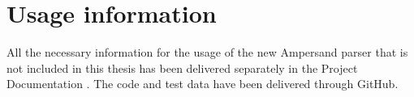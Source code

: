 
\section*{Usage information}
\label{sec:usage-information}
All the necessary information for the usage of the new Ampersand parser that is not included in this thesis has been delivered separately in the Project Documentation .
The code and test data have been delivered through GitHub.